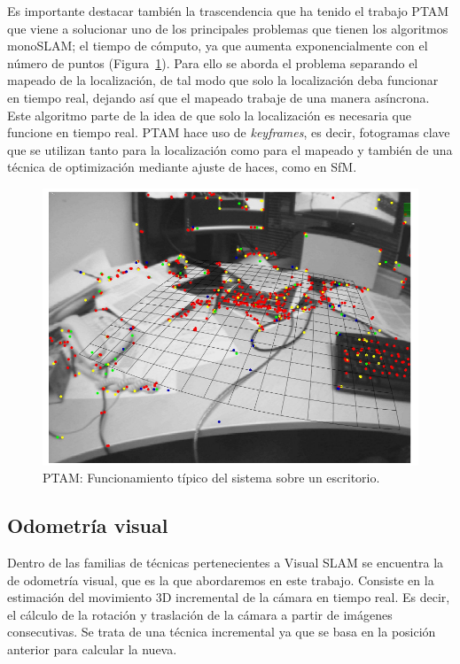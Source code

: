 Es importante destacar también la trascendencia que ha tenido el trabajo PTAM \parencite{Reference6} que viene a solucionar uno de los principales problemas que tienen los algoritmos monoSLAM; el tiempo de cómputo, ya que aumenta exponencialmente con el número de puntos (Figura~\ref{fig:Ptam}). Para ello se aborda el problema separando el mapeado de la localización, de tal modo que solo la localización deba funcionar en tiempo real, dejando así que el mapeado trabaje de una manera asíncrona. Este algoritmo parte de la idea de que solo la localización es necesaria que funcione en tiempo real. PTAM hace uso de \textit{keyframes}, es decir, fotogramas clave que se utilizan tanto para la localización como para el mapeado y también de una técnica de optimización mediante ajuste de haces, como en SfM.

\begin{figure}[th]
\centering
\includegraphics[scale=0.4]{Figures/ptam.png}
\decoRule
\caption[PTAM]{PTAM: Funcionamiento típico del sistema sobre un escritorio.}
\label{fig:Ptam}
\end{figure}

\subsection{Odometría visual}

Dentro de las familias de técnicas pertenecientes a Visual SLAM se encuentra la de odometría visual, que es la que abordaremos en este trabajo. Consiste en la estimación del movimiento 3D incremental de la cámara en tiempo real. Es decir, el cálculo de la rotación y traslación de la cámara a partir de imágenes consecutivas. Se trata de una técnica incremental ya que se basa en la posición anterior para calcular la nueva.


